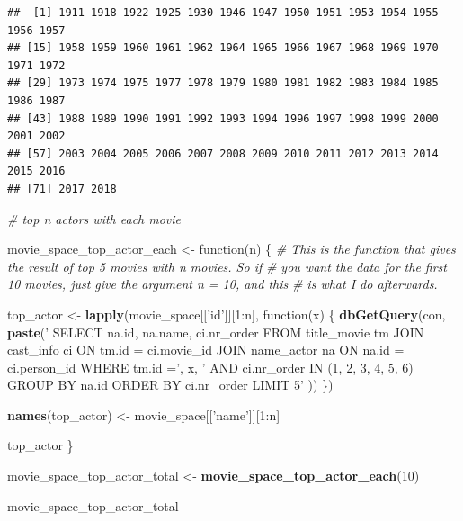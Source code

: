 \documentclass[]{article}
\newenvironment{Shaded}{\begin{snugshade}}{\end{snugshade}}
\newcommand{\KeywordTok}[1]{\textcolor[rgb]{0.13,0.29,0.53}{\textbf{{#1}}}}
\newcommand{\DecValTok}[1]{\textcolor[rgb]{0.00,0.00,0.81}{{#1}}}
\newcommand{\StringTok}[1]{\textcolor[rgb]{0.31,0.60,0.02}{{#1}}}
\newcommand{\CommentTok}[1]{\textcolor[rgb]{0.56,0.35,0.01}{\textit{{#1}}}}
\newcommand{\NormalTok}[1]{{#1}}
\begin{document}
\begin{verbatim}
##  [1] 1911 1918 1922 1925 1930 1946 1947 1950 1951 1953 1954 1955 1956 1957
## [15] 1958 1959 1960 1961 1962 1964 1965 1966 1967 1968 1969 1970 1971 1972
## [29] 1973 1974 1975 1977 1978 1979 1980 1981 1982 1983 1984 1985 1986 1987
## [43] 1988 1989 1990 1991 1992 1993 1994 1996 1997 1998 1999 2000 2001 2002
## [57] 2003 2004 2005 2006 2007 2008 2009 2010 2011 2012 2013 2014 2015 2016
## [71] 2017 2018
\end{verbatim}

\begin{Shaded}
\begin{Highlighting}[]
\CommentTok{# top n actors with each movie}

\NormalTok{movie_space_top_actor_each <-}\StringTok{ }\NormalTok{function(n) \{}
  \CommentTok{# This is the function that gives the result of top 5 movies with n movies. So if}
  \CommentTok{# you want the data for the first 10 movies, just give the argument n = 10, and this}
  \CommentTok{# is what I do afterwards.}

  \NormalTok{top_actor <-}\StringTok{ }\KeywordTok{lapply}\NormalTok{(movie_space[[}\StringTok{'id'}\NormalTok{]][}\DecValTok{1}\NormalTok{:n], function(x) \{}
                \KeywordTok{dbGetQuery}\NormalTok{(con, }\KeywordTok{paste}\NormalTok{(}\StringTok{'}
\StringTok{                           SELECT na.id, na.name, ci.nr_order}
\StringTok{                           FROM title_movie tm JOIN cast_info ci ON tm.id = ci.movie_id}
\StringTok{                              JOIN name_actor na ON na.id = ci.person_id}
\StringTok{                           WHERE tm.id ='}\NormalTok{, x, }\StringTok{'}
\StringTok{                           AND ci.nr_order IN (1, 2, 3, 4, 5, 6)}
\StringTok{                           GROUP BY na.id}
\StringTok{                           ORDER BY ci.nr_order}
\StringTok{                           LIMIT 5'}
                           \NormalTok{))}
              \NormalTok{\})}

  \KeywordTok{names}\NormalTok{(top_actor) <-}\StringTok{ }\NormalTok{movie_space[[}\StringTok{'name'}\NormalTok{]][}\DecValTok{1}\NormalTok{:n]}

  \NormalTok{top_actor}
\NormalTok{\}}

\NormalTok{movie_space_top_actor_total <-}\StringTok{ }\KeywordTok{movie_space_top_actor_each}\NormalTok{(}\DecValTok{10}\NormalTok{)}

\NormalTok{movie_space_top_actor_total}
\end{Highlighting}
\end{Shaded}
\end{document}

